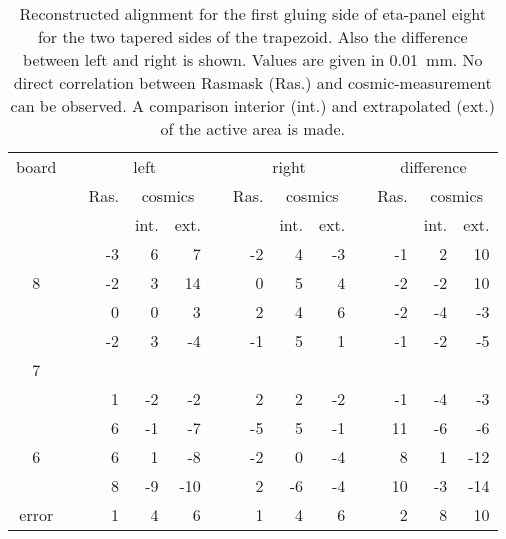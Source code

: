 \documentclass[
twoside,            %
BCOR1.4cm,          %
10pt,               %
headings=normal,    %
headsepline,        %
clearplainpage,		%
final,              %
div=14,
open=right,
bibliography=toc
]{scrreprt}
\begin{document}
\begin{table}[!h]
	\centering	
	\begin{tabular}{ccrrrcrrrcrrr}
		\hline
		\hline
		board & \hspace{1mm} & \multicolumn{3}{c}{left} & \hspace{1mm} & \multicolumn{3}{c}{right} & \hspace{1mm} & \multicolumn{3}{c}{difference}
		\\
		 & & Ras. & \multicolumn{2}{c}{cosmics} & & Ras. & \multicolumn{2}{c}{cosmics} & & Ras. & \multicolumn{2}{c}{cosmics}
		\\
	 	 & &       & int. & ext. & &      & int. & ext. & &      & int. & ext.
 		\\
		\hline
		  & &   -3 &    6 &    7 & &   -2 &    4 &   -3 & &   -1 &    2 &   10
		\\
		8 & &   -2 &    3 &   14 & &    0 &    5 &    4 & &   -2 &   -2 &   10
		\\
		  & &    0 &    0 &    3 & &    2 &    4 &    6 & &   -2 &   -4 &   -3
		\\
		\hline
		  & &   -2 &    3 &   -4 & &   -1 &    5 &    1 & &   -1 &   -2 &   -5
		\\
		7 & &      &      &      & &      &      &      & &      &      &      
		\\
		  & &    1 &   -2 &   -2 & &    2 &    2 &   -2 & &   -1 &   -4 &   -3
		\\
		\hline
		  & &    6 &   -1 &   -7 & &   -5 &    5 &   -1 & &   11 &   -6 &   -6
		\\
		6 & &    6 &    1 &   -8 & &   -2 &    0 &   -4 & &    8 &    1 &  -12
		\\
		  & &    8 &   -9 &  -10 & &    2 &   -6 &   -4 & &   10 &   -3 &  -14
 		\\
	 	\hline
	 	error & & 1 & 4 & 6 & & 1 & 4 & 6 & & 2 & 8 & 10
 		\\
	 	\hline
		\hline
	\end{tabular}
	\caption{
		Reconstructed alignment for the first gluing side of eta-panel eight for the two tapered sides of the trapezoid.
		Also the difference between left and right is shown.
		Values are given in \SI{0.01}{mm}.
		No direct correlation between Rasmask (Ras.) and cosmic-measurement can be observed.
		A comparison interior (int.) and extrapolated (ext.) of the active area is made.
	}
	\label{eta8gs1alignment}
	\vspace{-5mm}	
\end{table}
\end{document}

